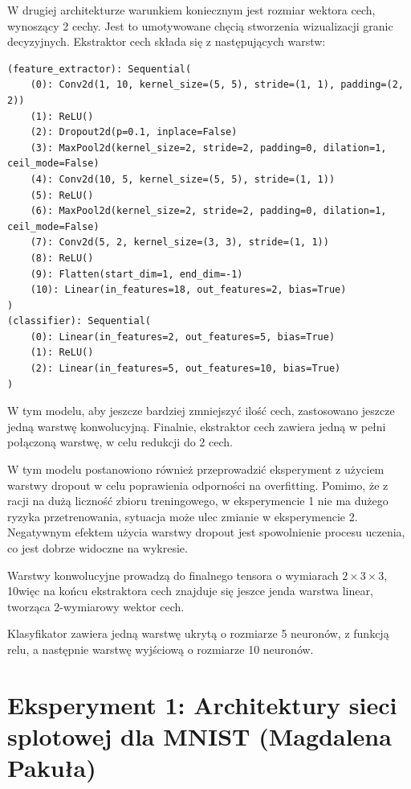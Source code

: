 \documentclass[10pt]{article}
\begin{document}
W drugiej architekturze warunkiem koniecznym jest rozmiar wektora cech, wynoszący 2 cechy.
Jest to umotywowane chęcią stworzenia wizualizacji granic decyzyjnych.
Ekstraktor cech składa się z następujących warstw:
\tiny
\begin{verbatim}
(feature_extractor): Sequential(
    (0): Conv2d(1, 10, kernel_size=(5, 5), stride=(1, 1), padding=(2, 2))
    (1): ReLU()
    (2): Dropout2d(p=0.1, inplace=False)
    (3): MaxPool2d(kernel_size=2, stride=2, padding=0, dilation=1, ceil_mode=False)
    (4): Conv2d(10, 5, kernel_size=(5, 5), stride=(1, 1))
    (5): ReLU()
    (6): MaxPool2d(kernel_size=2, stride=2, padding=0, dilation=1, ceil_mode=False)
    (7): Conv2d(5, 2, kernel_size=(3, 3), stride=(1, 1))
    (8): ReLU()
    (9): Flatten(start_dim=1, end_dim=-1)
    (10): Linear(in_features=18, out_features=2, bias=True)
)
(classifier): Sequential(
    (0): Linear(in_features=2, out_features=5, bias=True)
    (1): ReLU()
    (2): Linear(in_features=5, out_features=10, bias=True)
)
\end{verbatim}
\normalsize

W tym modelu, aby jeszcze bardziej zmniejszyć ilość cech, zastosowano jeszcze jedną warstwę konwolucyjną.
Finalnie, ekstraktor cech zawiera jedną w pełni połączoną warstwę, w celu redukcji do 2 cech.

W tym modelu postanowiono również przeprowadzić eksperyment z użyciem warstwy dropout w celu poprawienia
odporności na overfitting.
Pomimo, że z racji na dużą liczność zbioru treningowego, w eksperymencie 1 nie ma dużego ryzyka przetrenowania, 
sytuacja może ulec zmianie w eksperymencie 2. Negatywnym efektem użycia warstwy dropout jest spowolnienie procesu uczenia, co jest dobrze widoczne na wykresie.

Warstwy konwolucyjne prowadzą do finalnego tensora o wymiarach $2 \times 3 \times 3$, 10więc na końcu ekstraktora cech znajduje się jeszce jenda warstwa linear, tworząca 2-wymiarowy wektor cech.

Klasyfikator zawiera jedną warstwę ukrytą o rozmiarze 5 neuronów, z funkcją relu, a następnie warstwę wyjściową o rozmiarze 10 neuronów.

\pagebreak
\section{Eksperyment 1: Architektury sieci splotowej dla MNIST (Magdalena Pakuła)}\label{sec:ex1-pakula_mnist}
\end{document}

